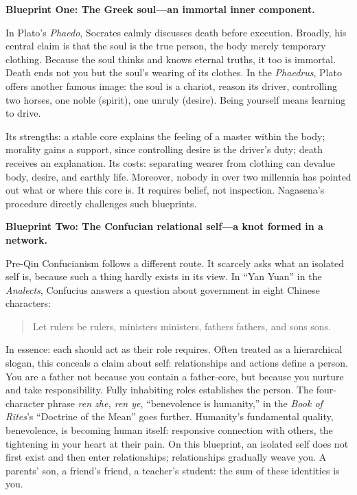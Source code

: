 \textbf{Blueprint One: The Greek soul---an immortal inner component.}

In Plato's \textit{Phaedo}, Socrates calmly discusses death before execution. Broadly, his central claim is that the soul is the true person, the body merely temporary clothing. Because the soul thinks and knows eternal truths, it too is immortal. Death ends not you but the soul's wearing of its clothes. In the \textit{Phaedrus}, Plato offers another famous image: the soul is a chariot, reason its driver, controlling two horses, one noble (spirit), one unruly (desire). Being yourself means learning to drive.

Its strengths: a stable core explains the feeling of a master within the body; morality gains a support, since controlling desire is the driver's duty; death receives an explanation. Its costs: separating wearer from clothing can devalue body, desire, and earthly life. Moreover, nobody in over two millennia has pointed out what or where this core is. It requires belief, not inspection. Nagasena's procedure directly challenges such blueprints.

\textbf{Blueprint Two: The Confucian relational self---a knot formed in a network.}

Pre-Qin Confucianism follows a different route. It scarcely asks what an isolated self is, because such a thing hardly exists in its view. In ``Yan Yuan'' in the \textit{Analects}, Confucius answers a question about government in eight Chinese characters:

\begin{quote}
Let rulers be rulers, ministers ministers, fathers fathers, and sons sons.
\end{quote}
In essence: each should act as their role requires. Often treated as a hierarchical slogan, this conceals a claim about self: relationships and actions define a person. You are a father not because you contain a father-core, but because you nurture and take responsibility. Fully inhabiting roles establishes the person. The four-character phrase \textit{ren zhe, ren ye}, ``benevolence is humanity,'' in the \textit{Book of Rites}'s ``Doctrine of the Mean'' goes further. Humanity's fundamental quality, benevolence, is becoming human itself: responsive connection with others, the tightening in your heart at their pain. On this blueprint, an isolated self does not first exist and then enter relationships; relationships gradually weave you. A parents' son, a friend's friend, a teacher's student: the sum of these identities is you.

